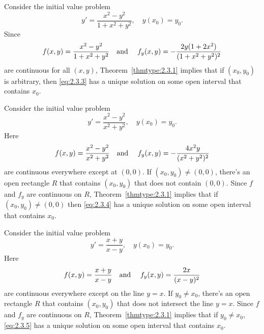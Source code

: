 \begin{example}
  \label{example:2.3.1} \rm Consider the initial value problem
  \begin{equation}
    \label{eq:2.3.3}y'=\frac{x^{2}-y^{2}}{1+x^{2}+y^{2}},\quad y(x_{0})=y_{0}.
  \end{equation}
  Since
  \[
    f(x,y)=\frac{x^{2}-y^{2}}{1+x^{2}+y^{2}}\mbox{\quad and \quad}f_{y}(x,y)=-\frac{2y(1+2x^{2})}{(1+x^{2}+y^{2})^{2}}
  \]
  are continuous for all $(x,y)$, Theorem~\ref{thmtype:2.3.1} implies that if $(x_{0},y_{0})$ is
  arbitrary, then \eqref{eq:2.3.3} has a unique solution on some open interval that contains
  $x_{0}$.
\end{example}

\begin{example}
  \label{example:2.3.2} \rm Consider the initial value problem
  \begin{equation}
    \label{eq:2.3.4}y'=\frac{x^{2}-y^{2}}{x^{2}+y^{2}},\quad y(x_{0})=y_{0}.
  \end{equation}
  Here
  \[
    f(x,y)=\frac{x^{2}-y^{2}}{x^{2}+y^{2}}\mbox{\quad and \quad}f_{y}(x,y)=\displaystyle-\frac{4x^{2}y}{(x^{2}+y^{2})^{2}}
  \]
  are continuous everywhere except at $(0,0)$. If $(x_{0},y_{0}) \ne(0,0)$, there's an open
  rectangle $R$ that contains $(x_{0},y_{0})$ that does not contain $(0,0)$. Since $f$ and $f_{y}$
  are continuous on $R$, Theorem~\ref{thmtype:2.3.1} implies that if $(x_{0},y_{0})\ne(0,0)$ then
  \eqref{eq:2.3.4} has a unique solution on some open interval that contains $x_{0}$.
\end{example}

\begin{example}
  \label{example:2.3.3} \rm Consider the initial value problem
  \begin{equation}
    \label{eq:2.3.5}y'=\frac{x+y}{x-y},\quad y(x_{0})=y_{0}.
  \end{equation}
  Here
  \[
    f(x,y)=\frac{x+y}{x-y}\mbox{\quad and \quad}f_{y}(x,y)=\frac{2x}{(x-y)^{2}}
  \]
  are continuous everywhere except on the line $y=x$. If $y_{0}\ne x_{0}$, there's an open rectangle
  $R$ that contains $(x_{0},y_{0})$ that does not intersect the line $y=x$. Since $f$ and $f_{y}$
  are continuous on $R$, Theorem~\ref{thmtype:2.3.1} implies that if $y_{0}\ne x_{0}$,
  \eqref{eq:2.3.5} has a unique solution on some open interval that contains $x_{0}$.
\end{example}

